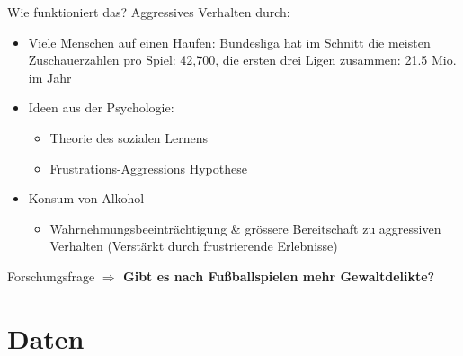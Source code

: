 \documentclass[usenames,dvipsnames,ngerman]{beamer} %
\begin{document}
\begin{frame}{Wie funktioniert das?}
Aggressives Verhalten durch: 
	
	\begin{itemize}
		\item Viele Menschen auf einen Haufen: Bundesliga hat im Schnitt die meisten Zuschauerzahlen pro Spiel: 42,700, die ersten drei Ligen zusammen: 21.5 Mio. im Jahr
		\item Ideen aus der Psychologie:
		\begin{itemize}
			\item Theorie des sozialen Lernens 
			\item Frustrations-Aggressions Hypothese
		\end{itemize}
		\item Konsum von Alkohol
		\begin{itemize}
			\item Wahrnehmungsbeeinträchtigung \& grössere Bereitschaft zu aggressiven Verhalten (Verstärkt durch frustrierende Erlebnisse)
		\end{itemize} 
	\end{itemize}

	\begin{block}{Forschungsfrage}
		\textbf{$\Rightarrow$ Gibt es nach Fußballspielen mehr Gewaltdelikte?}
	\end{block}		
	
\end{frame}




\section{Daten}
\end{document}
